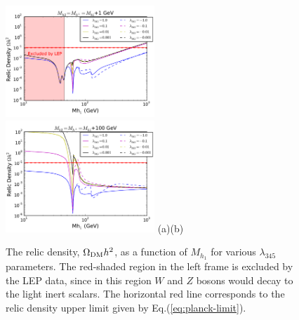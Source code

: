 \documentclass[12pt,a4paper]{article}
\begin{document}
\begin{figure}[htb]
\centering
{\includegraphics[width=0.5\textwidth]{Omega_Mh1_new.pdf}}%
{\includegraphics[width=0.5\textwidth]{Omega_Mh1_mh+100_new.pdf}}%
\vskip -0.5cm\hspace*{-3cm}(a)\hspace*{0.48\textwidth}(b)
\caption{The relic density, $\Omega_{\rm DM} h^2$,   as a function of $M_{h_1}$
for various $\lambda_{345}$ parameters. The red-shaded region in the left frame is excluded by the LEP data, 
since in this region $W$ and $Z$ bosons would decay to the light inert scalars. 
The horizontal red line corresponds to the relic density upper limit given by Eq.(\ref{eq:planck-limit}).}
\label{fig:1d-mh1-Omega}
\end{figure}
%
 
\end{document}
